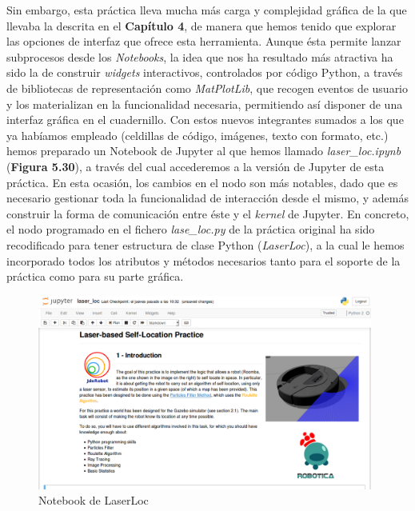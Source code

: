 Sin embargo, esta práctica lleva mucha más carga y complejidad gráfica de la que llevaba la descrita en el \textbf{Capítulo 4}, de manera que hemos tenido que explorar las opciones de interfaz que ofrece esta herramienta. Aunque ésta permite lanzar subprocesos desde los \textit{Notebooks}, la idea que nos ha resultado más atractiva ha sido la de construir \textit{widgets} interactivos, controlados por código Python, a través de bibliotecas de representación como \textit{MatPlotLib}, que recogen eventos de usuario y los materializan en la funcionalidad necesaria, permitiendo así disponer de una interfaz gráfica en el cuadernillo. Con estos nuevos integrantes sumados a los que ya habíamos empleado (celdillas de código, imágenes, texto con formato, etc.) hemos preparado un Notebook de Jupyter al que hemos llamado \textit{laser\_loc.ipynb} (\textbf{Figura 5.30}), a través del cual accederemos a la versión de Jupyter de esta práctica. En esta ocasión, los cambios en el nodo son más notables, dado que es necesario gestionar toda la funcionalidad de interacción desde el mismo, y además construir la forma de comunicación entre éste y el \textit{kernel} de Jupyter. En concreto, el nodo programado en el fichero \textit{lase\_loc.py} de la práctica original ha sido recodificado para tener estructura de clase Python (\textit{LaserLoc}), a la cual le hemos incorporado todos los atributos y métodos necesarios tanto para el soporte de la práctica como para su parte gráfica. 

\begin{figure}[H]
	\begin{center}
		\includegraphics[width=0.98\textwidth]{figures/laserlocjupyter.png}
		\caption{Notebook de LaserLoc}
		\label{fig.laserlocjupyter}
		\end{center}
\end{figure}

